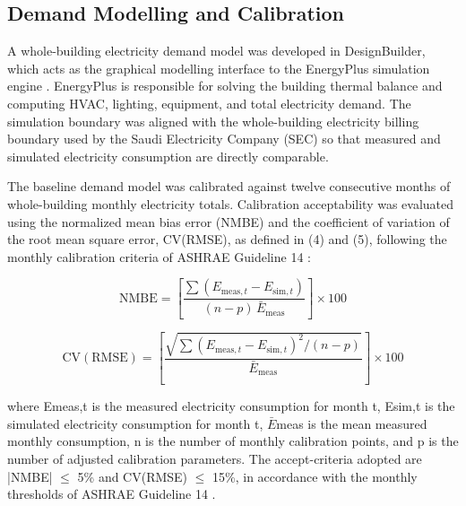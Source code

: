 \documentclass[journal,fleqn]{IEEEtran}
\begin{document}
\par

\subsection{Demand Modelling and Calibration}

A whole-building electricity demand model was developed in DesignBuilder, which acts as the graphical modelling interface to the EnergyPlus simulation engine \cite{ref22}. EnergyPlus is responsible for solving the building thermal balance and computing HVAC, lighting, equipment, and total electricity demand. The simulation boundary was aligned with the whole-building electricity billing boundary used by the Saudi Electricity Company (SEC) so that measured and simulated electricity consumption are directly comparable.


The baseline demand model was calibrated against twelve consecutive months of whole-building monthly electricity totals. Calibration acceptability was evaluated using the normalized mean bias error (NMBE) and the coefficient of variation of the root mean square error, CV(RMSE), as defined in (4) and (5), following the monthly calibration criteria of ASHRAE Guideline 14 \cite{ref23}:


\begin{equation}\label{eq:nmbe}\mathrm{NMBE}=\left[\frac{\sum(E_{\mathrm{meas},t}-E_{\mathrm{sim},t})}{(n-p)\,\bar{E}_{\mathrm{meas}}}\right]\times100\end{equation}

\begin{equation}\label{eq:cvrmse}\mathrm{CV(RMSE)}=\left[\frac{\sqrt{\sum(E_{\mathrm{meas},t}-E_{\mathrm{sim},t})^2/(n-p)}}{\bar{E}_{\mathrm{meas}}}\right]\times100\end{equation}

where Emeas,t is the measured electricity consumption for month t, Esim,t is the simulated electricity consumption for month t, $\bar{E}$meas is the mean measured monthly consumption, n is the number of monthly calibration points, and p is the number of adjusted calibration parameters. The accept-criteria adopted are |NMBE| $\leq$ 5\% and CV(RMSE) $\leq$ 15\%, in accordance with the monthly thresholds of ASHRAE Guideline 14 \cite{ref23}.
\end{document}
